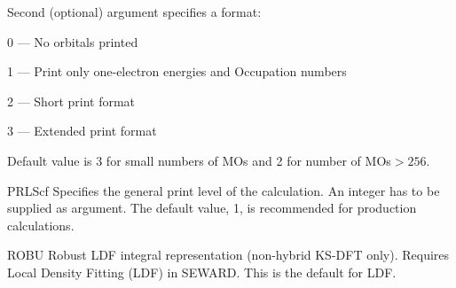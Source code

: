 \begin{keywordlist}
Second (optional) argument specifies a format:
\begin{list}{}{}
\item 0 --- No orbitals printed
\item 1 --- Print only one-electron energies and Occupation numbers
\item 2 --- Short print format
\item 3 --- Extended print format
\end{list}
Default value is 3 for small numbers of MOs and 2 for number of MOs$>256$.
\item[PRLScf]
Specifies the general print level of the calculation. An integer
has to be supplied as argument.
The default value, 1, is recommended for production calculations.
\item[ROBU]
Robust LDF integral representation (non-hybrid KS-DFT only).
Requires Local Density Fitting (LDF) in SEWARD. This is the default for LDF.

\end{keywordlist}
